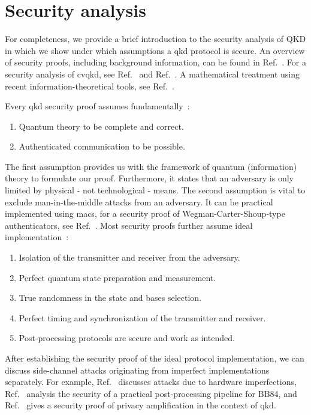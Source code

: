 \section{Security analysis}

For completeness, we provide a brief introduction to the security analysis of QKD in which we show under which assumptions a \gls{qkd} protocol is secure.
An overview of security proofs, including background information, can be found in Ref.~\cite{Scarani2009}.
For a security analysis of \gls{cvqkd}, see Ref.~\cite{Diamanti2015} and Ref.~\cite{Laudenbach2018}. 
A mathematical treatment using recent information-theoretical tools, see Ref.~\cite{Wolf2021}.

Every \gls{qkd} security proof assumes fundamentally~\cite[p.~10]{Scarani2009}:
\begin{enumerate}
	\item Quantum theory to be complete and correct.
	\item Authenticated communication to be possible.
\end{enumerate}
The first assumption provides us with the framework of quantum (information) theory to formulate our proof.
Furthermore, it states that an adversary is only limited by physical - not technological - means.
The second assumption is vital to exclude man-in-the-middle attacks from an adversary.
It can be practical implemented using \gls{mac}s, for a security proof of Wegman-Carter-Shoup-type authenticators, see Ref.~\cite{Bernstein2005}.
Most security proofs further assume ideal implementation~\cite[p.~124]{Wolf2021}:
\begin{enumerate}
	\item Isolation of the transmitter and receiver from the adversary.
	\item Perfect quantum state preparation and measurement.
	\item True randomness in the state and bases selection.
	\item Perfect timing and synchronization of the transmitter and receiver.
	\item Post-processing protocols are secure and work as intended.
\end{enumerate}
After establishing the security proof of the ideal protocol implementation, we can discuss side-channel attacks originating from imperfect implementations separately.
For example, Ref.~\cite[p.~8]{Lo2014} discusses attacks due to hardware imperfections, Ref.~\cite{Fung2010} analysis the security of a practical post-processing pipeline for BB84, and Ref.~\cite{Renner2005} gives a security proof of privacy amplification in the context of \gls{qkd}.

